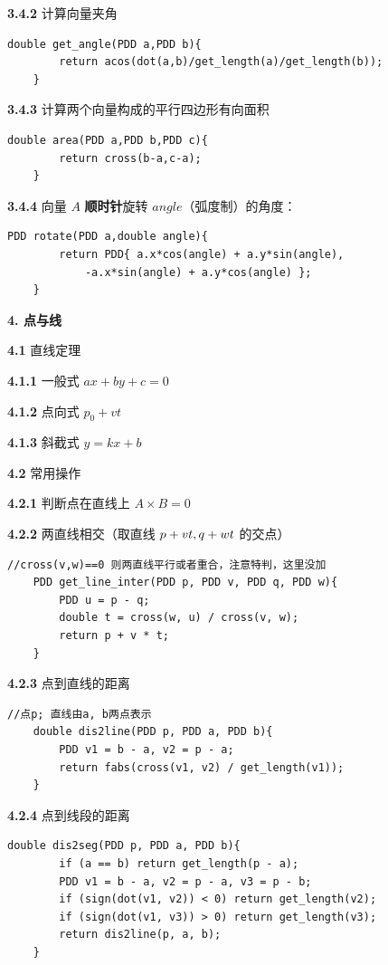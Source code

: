 \textbf{3.4.2} 计算向量夹角

\begin{lstlisting}[style=C++]
	double get_angle(PDD a,PDD b){
		return acos(dot(a,b)/get_length(a)/get_length(b));
	}
\end{lstlisting}

\textbf{3.4.3} 计算两个向量构成的平行四边形有向面积

\begin{lstlisting}[style=C++]
	double area(PDD a,PDD b,PDD c){
		return cross(b-a,c-a);
	}
\end{lstlisting}

\textbf{3.4.4} 向量 $A$ \textbf{顺时针}旋转 $angle$（弧度制）的角度：

\begin{lstlisting}[style=C++]
	PDD rotate(PDD a,double angle){
		return PDD{ a.x*cos(angle) + a.y*sin(angle),
			-a.x*sin(angle) + a.y*cos(angle) };
	}
\end{lstlisting}

\textbf{4. 点与线}

\textbf{4.1} 直线定理

\textbf{4.1.1} 一般式 $ax+by+c=0$

\textbf{4.1.2} 点向式 $p_0+vt$

\textbf{4.1.3} 斜截式 $y=kx+b$

\textbf{4.2} 常用操作

\textbf{4.2.1} 判断点在直线上 $A\times B=0$

\textbf{4.2.2} 两直线相交（取直线 $p+vt,\space q+wt$ 的交点）

\begin{lstlisting}[style=C++]
	//cross(v,w)==0 则两直线平行或者重合，注意特判，这里没加
	PDD get_line_inter(PDD p, PDD v, PDD q, PDD w){
		PDD u = p - q;
		double t = cross(w, u) / cross(v, w);
		return p + v * t;
	}
\end{lstlisting}

\textbf{4.2.3} 点到直线的距离

\begin{lstlisting}[style=C++]
	//点p; 直线由a, b两点表示
	double dis2line(PDD p, PDD a, PDD b){
		PDD v1 = b - a, v2 = p - a;
		return fabs(cross(v1, v2) / get_length(v1));
	}
\end{lstlisting}

\textbf{4.2.4} 点到线段的距离

\begin{lstlisting}[style=C++]
	double dis2seg(PDD p, PDD a, PDD b){
		if (a == b) return get_length(p - a);
		PDD v1 = b - a, v2 = p - a, v3 = p - b;
		if (sign(dot(v1, v2)) < 0) return get_length(v2);
		if (sign(dot(v1, v3)) > 0) return get_length(v3);
		return dis2line(p, a, b);
	}
\end{lstlisting}

